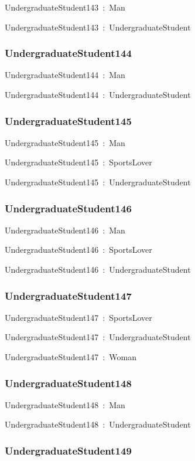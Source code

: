 \documentclass{article}
\begin{document}
UndergraduateStudent143~:~Man

UndergraduateStudent143~:~UndergraduateStudent

\subsubsection*{UndergraduateStudent144}

UndergraduateStudent144~:~Man

UndergraduateStudent144~:~UndergraduateStudent

\subsubsection*{UndergraduateStudent145}

UndergraduateStudent145~:~Man

UndergraduateStudent145~:~SportsLover

UndergraduateStudent145~:~UndergraduateStudent

\subsubsection*{UndergraduateStudent146}

UndergraduateStudent146~:~Man

UndergraduateStudent146~:~SportsLover

UndergraduateStudent146~:~UndergraduateStudent

\subsubsection*{UndergraduateStudent147}

UndergraduateStudent147~:~SportsLover

UndergraduateStudent147~:~UndergraduateStudent

UndergraduateStudent147~:~Woman

\subsubsection*{UndergraduateStudent148}

UndergraduateStudent148~:~Man

UndergraduateStudent148~:~UndergraduateStudent

\subsubsection*{UndergraduateStudent149}
\end{document}
